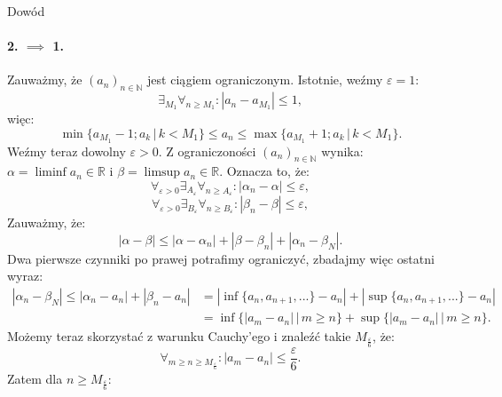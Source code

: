 \documentclass{article}
\newcommand{\R}{\mathbb{R}}
\newcommand{\N}{\mathbb{N}}
\newcommand{\eps}{\varepsilon}
\newcommand{\ciag}[1]{(#1_{n})_{n \in \N}}
\begin{document}
\begin{dow}{Dowód}
        \paragraph*{2. $\implies$ 1.} Zauważmy, że $\ciag{a}$ jest ciągiem ograniczonym. Istotnie, weźmy $\eps = 1$: \begin{equation}
            \exists_{M_1} \forall_{n \geqslant M_1}: |a_n - a_{M_1}| \leqslant 1,
        \end{equation} więc: \begin{equation}
            \min \{ a_{M_1} -1; a_k \, \big| \, k < M_1 \} \leqslant a_n \leqslant \max \{ a_{M_1} +1; a_k \, \big| \, k < M_1 \}.
        \end{equation}
        Weźmy teraz dowolny $\eps > 0$. Z ograniczoności $\ciag{a}$ wynika: $\alpha = \liminf a_n \in \R$ i $\beta = \limsup a_n \in \R$. Oznacza to, że: \begin{equation}
            \forall_{\eps > 0} \exists_{A_\eps} \forall_{n \geqslant A_\eps}: |\alpha_n - \alpha| \leqslant \eps,
        \end{equation} \begin{equation}
            \forall_{\eps > 0} \exists_{B_\eps} \forall_{n \geqslant B_\eps}: |\beta_n - \beta| \leqslant \eps,
        \end{equation}
        Zauważmy, że: \begin{equation}
            |\alpha - \beta| \leqslant |\alpha - \alpha_n| + |\beta - \beta_n| + |\alpha_n - \beta_N|.
        \end{equation}
        Dwa pierwsze czynniki po prawej potrafimy ograniczyć, zbadajmy więc ostatni wyraz: \begin{equation} \begin{split}
            |\alpha_n - \beta_N| \leqslant |\alpha_n - a_n| + |\beta_n - a_n| & = |\inf\{a_n, a_{n+1}, ...\} - a_n| + |\sup\{a_n, a_{n+1}, ...\} - a_n| \\ 
            & = \inf\{ |a_m - a_n| \, \big| \, m \geqslant n \} + \sup\{ |a_m - a_n| \, \big| \, m \geqslant n \}.
        \end{split} \end{equation}
        Możemy teraz skorzystać z warunku Cauchy'ego i znaleźć takie $M_{\frac{\eps}{6}}$, że: \begin{equation}
            \forall_{m \geqslant n \geqslant M_{\frac{\eps}{6}}}: |a_m - a_n| \leqslant \frac{\eps}{6}.
        \end{equation} Zatem dla $n \geqslant M_{\frac{\eps}{6}}$:\begin{equation}

\end{equation}
\end{dow}
\end{document}
